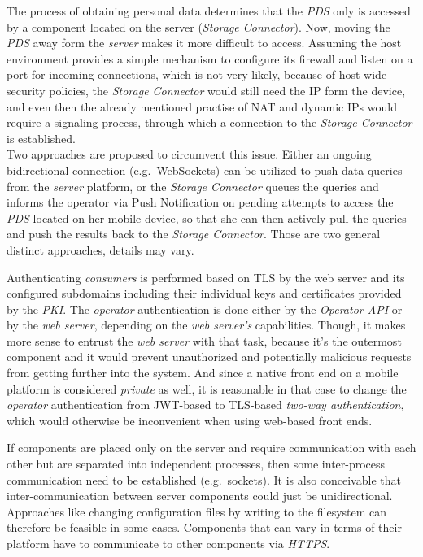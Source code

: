 \documentclass[12pt,english,a4paper,titlepage,cleardoublepage=empty,dottedtoc]{report}
\begin{document}
The process of obtaining personal data determines that the \emph{PDS}
only is accessed by a component located on the server (\emph{Storage
Connector}). Now, moving the \emph{PDS} away form the \emph{server}
makes it more difficult to access. Assuming the host environment
provides a simple mechanism to configure its firewall and listen on a
port for incoming connections, which is not very likely, because of
host-wide security policies, the \emph{Storage Connector} would still
need the IP form the device, and even then the already mentioned
practise of NAT and dynamic IPs would require a signaling process,
through which a connection to the \emph{Storage Connector} is
established.\\
Two approaches are proposed to circumvent this issue. Either an ongoing
bidirectional connection (e.g.~WebSockets) can be utilized to push data
queries from the \emph{server} platform, or the \emph{Storage Connector}
queues the queries and informs the operator via Push Notification on
pending attempts to access the \emph{PDS} located on her mobile device,
so that she can then actively pull the queries and push the results back
to the \emph{Storage Connector}. Those are two general distinct
approaches, details may vary.

Authenticating \emph{consumers} is performed based on TLS by the web
server and its configured subdomains including their individual keys and
certificates provided by the \emph{PKI}. The \emph{operator}
authentication is done either by the \emph{Operator API} or by the
\emph{web server}, depending on the \emph{web server's} capabilities.
Though, it makes more sense to entrust the \emph{web server} with that
task, because it's the outermost component and it would prevent
unauthorized and potentially malicious requests from getting further
into the system. And since a native front end on a mobile platform is
considered \emph{private} as well, it is reasonable in that case to
change the \emph{operator} authentication from JWT-based to TLS-based
\emph{two-way authentication}, which would otherwise be inconvenient
when using web-based front ends.

If components are placed only on the server and require communication
with each other but are separated into independent processes, then some
inter-process communication need to be established (e.g.~sockets). It is
also conceivable that inter-communication between server components
could just be unidirectional. Approaches like changing configuration
files by writing to the filesystem can therefore be feasible in some
cases. Components that can vary in terms of their platform have to
communicate to other components via \emph{HTTPS}.
\end{document}

